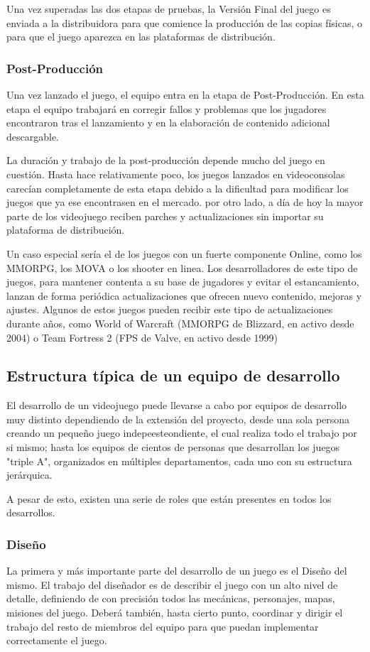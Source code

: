 Una vez superadas las dos etapas de pruebas, la Versión Final del juego es enviada a la distribuidora para que comience la producción de las copias físicas, o para que el juego aparezca en las plataformas de distribución.

\subsubsection{Post-Producción}
Una vez lanzado el juego, el equipo entra en la etapa de Post-Producción. En esta etapa el equipo trabajará en corregir fallos y problemas que los jugadores encontraron tras el lanzamiento y en la elaboración de contenido adicional descargable.

La duración y trabajo de la post-producción depende mucho del juego en cuestión. Hasta hace relativamente poco, los juegos lanzados en videoconsolas carecían completamente de esta etapa debido a la dificultad para modificar los juegos que ya ese encontrasen en el mercado. por otro lado, a día de hoy la mayor parte de los videojuego reciben parches y actualizaciones sin importar su plataforma de distribución.

Un caso especial sería el de los juegos con un fuerte componente Online, como los MMORPG, los MOVA o los shooter en linea. Los desarrolladores de este tipo de juegos, para mantener contenta a su base de jugadores y evitar el estancamiento, lanzan de forma periódica actualizaciones que ofrecen nuevo contenido, mejoras y ajustes. Algunos de estos juegos pueden recibir este tipo de actualizaciones durante años, como World of Warcraft (MMORPG de Blizzard, en activo desde 2004) o Team Fortress 2 (FPS de Valve, en activo desde 1999)

\subsection{Estructura típica de un equipo de desarrollo}
El desarrollo de un videojuego puede llevarse a cabo por equipos de desarrollo muy distinto dependiendo de la extensión del proyecto, desde una sola persona creando un pequeño juego indepeesteondiente, el cual realiza todo el trabajo por si mismo; hasta los equipos de cientos de personas que desarrollan los juegos "triple A", organizados en múltiples departamentos, cada uno con su estructura jerárquica.

A pesar de esto, existen una serie de roles que están presentes en todos los desarrollos. 
\subsubsection{Diseño}
La primera y más importante parte del desarrollo de un juego es el Diseño del mismo. El trabajo del diseñador es de describir el juego con un alto nivel de detalle, definiendo de con precisión todos las mecánicas, personajes, mapas, misiones del juego. Deberá también, hasta cierto punto, coordinar y dirigir el trabajo del resto de miembros del equipo para que puedan implementar correctamente el juego. 


